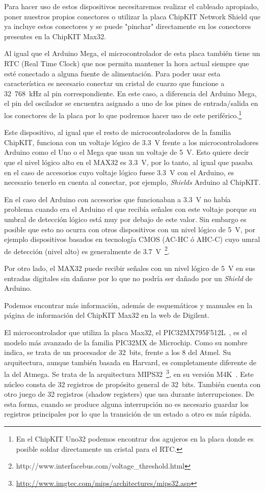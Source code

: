 Para hacer uso de estos dispositivos necesitaremos realizar el cableado apropiado, poner nuestros propios conectores o utilizar la placa ChipKIT Network Shield que ya incluye estos conectores y se puede "pinchar" directamente en los conectores presentes en la ChipKIT Max32. 

Al igual que el Arduino Mega, el microcontrolador de esta placa también tiene un RTC (Real Time Clock) que nos permita mantener la hora actual siempre que esté conectado a alguna fuente de alimentación. Para poder usar esta característica es necesario conectar un cristal de cuarzo que funcione a 32~768~kHz al pin correspondiente. En este caso, a diferencia del Arduino Mega, el pin del oscilador se encuentra asignado a uno de los pines de entrada/salida en los conectores de la placa por lo que podremos hacer uso de este periférico.\footnote{En el ChipKIT Uno32 podemos encontrar dos agujeros en la placa donde es posible soldar directamente un cristal para el RTC.}

Este dispositivo, al igual que el resto de microcontroladores de la familia ChipKIT, funciona con un voltaje lógico de 3.3~V frente a los microcontroladores Arduino como el Uno o el Mega que usan un voltaje de 5~V. Esto quiere decir que el nivel lógico alto en el MAX32 es 3.3~V, por lo tanto, al igual que pasaba en el caso de accesorios cuyo voltaje lógico fuese 3.3~V con el Arduino, es necesario tenerlo en cuenta al conectar, por ejemplo, \textit{Shields} Arduino al ChipKIT.

En el caso del Arduino con accesorios que funcionaban a 3.3~V no había problema cuando era el Arduino el que recibía señales con este voltaje porque su umbral de detección lógico está muy por debajo de este valor. Sin embargo es posible que esto no ocurra con otros dispositivos con un nivel lógico de 5~V, por ejemplo dispositivos basados en tecnología CMOS (AC-HC ó AHC-C) cuyo umral de detección (nivel alto) es generalmente de 3.7~V~\footnote{http://www.interfacebus.com/voltage\_threshold.html}.

Por otro lado, el MAX32 puede recibir señales con un nivel lógico de 5~V en sus entradas digitales sin dañarse por lo que no podría ser dañado por un \textit{Shield} de Arduino.

Podemos encontrar más información, además de esquemáticos y manuales en la página de información del ChipKIT Max32 en la web de Digilent.\cite{website:max32}

El microcontrolador que utiliza la placa Max32, el PIC32MX795F512L~\cite{website:pic32mx}, es el modelo más avanzado de la familia PIC32MX de Microchip. Como su nombre indica, se trata de un procesador de 32~bits, frente a los 8 del Atmel. Su arquitectura, aunque también basada en Harvard, es completamente diferente de la del Atmega. Se trata de la arquitectura MIPS32~\footnote{\url{http://www.imgtec.com/mips/architectures/mips32.asp}}, en su versión M4K~\cite{website:m4k_analysis}. Este núcleo consta de 32 registros de propósito general de 32~bits. También cuenta con otro juego de 32 registros (shadow registers) que usa durante interrupciones. De esta forma, cuando se produce alguna interrupción no es necesario guardar los registros principales por lo que la transición de un estado a otro es más rápida.

